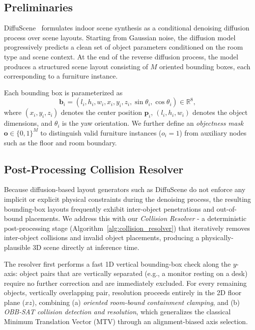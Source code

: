 \subsection{Preliminaries}
DiffuScene~\cite{tang2024diffuscenedenoisingdiffusionmodels} formulates indoor scene synthesis as a conditional denoising diffusion process over scene layouts. Starting from Gaussian noise, the diffusion model progressively predicts a clean set of object parameters conditioned on the room type and scene context. At the end of the reverse diffusion process, the model produces a structured scene layout consisting of $M$ oriented bounding boxes, each corresponding to a furniture instance.

Each bounding box is parameterized as
\begin{equation}
\mathbf{b}_i=(l_i,h_i,w_i,x_i,y_i,z_i,\sin\theta_i,\cos\theta_i)\in\mathbb{R}^{8},
\end{equation}
where $(x_i,y_i,z_i)$ denotes the center position $\mathbf{p}_i$, $(l_i,h_i,w_i)$ denotes the object dimensions, and $\theta_i$ is the yaw orientation. We further define an \emph{objectness mask} $\mathbf{o}\in\{0,1\}^{M}$ to distinguish valid furniture instances ($o_i=1$) from auxiliary nodes such as the floor and room boundary.

\subsection{Post-Processing Collision Resolver}
\label{sec:method:resolver}

Because diffusion-based layout generators such as DiffuScene do not enforce any implicit or explicit physical constraints during the denoising process, the resulting bounding-box layouts frequently exhibit inter-object penetrations and out-of-bound placements. We address this with our \emph{Collision Resolver} - a deterministic post-processing stage (Algorithm~\ref{alg:collision_resolver}) 
that iteratively removes inter-object collisions and invalid object placements, producing a physically-plausible 3D scene directly at inference time.

The resolver first performs a fast 1D vertical bounding-box check along the $y$-axis: object pairs that are vertically separated (e.g., a monitor resting on a desk) require no further correction and are immediately excluded. For 
every remaining objects, vertically overlapping pair, resolution proceeds entirely in the 2D floor plane ($xz$), combining (a) \emph{oriented room-bound containment clamping}, and (b) \emph{OBB-SAT collision detection and resolution}, which generalizes the classical Minimum Translation Vector (MTV) through an alignment-biased axis selection.

